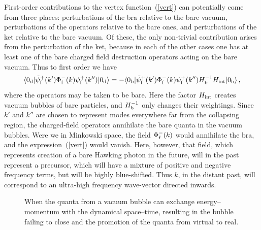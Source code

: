 \documentclass[12pt]{article}
\begin{document}
First-order contributions to the vertex function~(\ref{vert}) can potentially come from three places:  perturbations of the bra relative to the bare vacuum, perturbations of the operators relative to the bare ones, and perturbations of the ket relative to the bare vacuum.  Of these, the only non-trivial contribution arises from the perturbation of the ket, because in each of the other cases one has at least one of the bare charged field destruction operators acting on the bare vacuum.  Thus to first order we have
\begin{equation}\label{verte}
\langle 0_{\rm d}|{\tilde\psi}_{\rm f}^+(k')\Phi _{\rm f}^- (k)\psi _{\rm f}^+ (k'')|0_{\rm d}\rangle=
-\langle 0_{\rm b}|{\tilde\psi}_{\rm f}^+(k')\Phi _{\rm f}^- (k)\psi _{\rm f}^+ (k'')H_{\rm b}^{-1}H_{\rm int}|0_{\rm b}\rangle\, ,
\end{equation}
where the operators may be taken to be bare.  Here the factor $H_{\rm int}$ creates vacuum bubbles of bare particles, and $H_{\rm b}^{-1}$ only changes their weightings.  Since $k'$ and $k''$ are chosen to represent modes everywhere far from the collapsing region, the charged-field operators annihilate the bare quanta in the vacuum bubbles.  
Were we in Minkowski space, the field $\Phi ^-_{\rm f}(k)$ would annihilate the bra, and the expression~(\ref{vert}) would vanish.  Here, however, that field, which represents creation of a bare Hawking photon in the future, will in the past represent a precursor, which will have a mixture of positive and negative frequency terms, but will be highly blue-shifted.  Thus $k$, in the distant past, will correspond to an ultra-high frequency wave-vector directed inwards.  

\begin{figure}[t]
\caption{When the quanta from a vacuum bubble can exchange energy--momentum with the dynamical space--time, resulting in the bubble failing to close and the promotion of the quanta from virtual to real.}
\label{fig:brokenbubble}
\end{figure}
\end{document}
